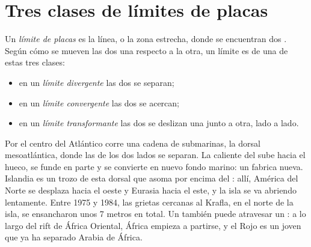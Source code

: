 \section{Tres clases de límites de placas}

\begin{definition}\label{def:g7:plate-tectonics:plate-boundary}
Un \emph{límite de placas} es la
línea, o la zona estrecha, donde se encuentran dos . Según cómo se
mueven las dos  una respecto a la otra, un límite es de una de estas
tres clases:
\begin{itemize}
  \item en un \emph{límite divergente}
        las dos  se separan;
  \item en un \emph{límite convergente}
        las dos  se acercan;
  \item en un \emph{límite transformante}
        las dos  se deslizan una junto a otra, lado a lado.
\end{itemize}
\end{definition}

\begin{example}\label{ex:g7:plate-tectonics:divergent}
Por el centro del  Atlántico corre una cadena de  submarinas,
la dorsal mesoatlántica, donde las  de los dos lados se separan. La
 caliente del  sube hacia el hueco, se funde en parte y se
convierte en nuevo fondo marino: un  fabrica  nueva.
Islandia es un trozo de esta dorsal que asoma por encima del : allí,
América del Norte se desplaza hacia el oeste y Eurasia hacia el este, y la
isla se va abriendo lentamente. Entre 1975 y 1984, las grietas cercanas al
 Krafla, en el norte de la isla, se ensancharon unos 7 metros en
total. Un  también puede atravesar un : a lo
largo del rift de África Oriental, África empieza a partirse, y el  Rojo
es un  joven que ya ha separado Arabia de África.
\end{example}


